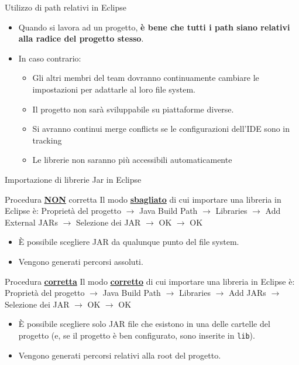 \documentclass[presentation]{beamer}
\begin{document}
\begin{frame}{Utilizzo di path relativi in Eclipse}
	\begin{itemize}\itemsep20pt
		\item Quando si lavora ad un progetto, \textbf{è bene che tutti i path siano relativi alla radice del progetto stesso}.
		\item In caso contrario:
		\begin{itemize}
			\item Gli altri membri del team dovranno continuamente cambiare le impostazioni per adattarle al loro file system.
			\item Il progetto non sarà sviluppabile su piattaforme diverse.
			\item Si avranno continui merge conflicts se le configurazioni dell'IDE sono in tracking
			\item Le librerie non saranno più accessibili automaticamente
		\end{itemize}
	\end{itemize}
\end{frame}

\begin{frame}[allowframebreaks]{Importazione di librerie Jar in Eclipse}
	\begin{block}{Procedura \textbf{\underline{NON}} corretta}
		Il modo \textbf{\underline{sbagliato}} di cui importare una libreria in Eclipse è: Proprietà del progetto $\rightarrow$ Java Build Path $\rightarrow$ Libraries $\rightarrow$ Add External JARs $\rightarrow$ Selezione dei JAR $\rightarrow$ OK $\rightarrow$ OK
		\begin{itemize}
			\item \`{E} possibile scegliere JAR da qualunque punto del file system.
			\item Vengono generati percorsi assoluti.
		\end{itemize}
	\end{block}
	\begin{block}{Procedura \textbf{\underline{corretta}}}
		Il modo \textbf{\underline{corretto}} di cui importare una libreria in Eclipse è: Proprietà del progetto $\rightarrow$ Java Build Path $\rightarrow$ Libraries $\rightarrow$ Add JARs $\rightarrow$ Selezione dei JAR $\rightarrow$ OK $\rightarrow$ OK
		\begin{itemize}
			\item \`{E} possibile scegliere solo JAR file che esistono in una delle cartelle del progetto (e, se il progetto è ben configurato, sono inserite in \texttt{lib}).
			\item Vengono generati percorsi relativi alla root del progetto.
		\end{itemize}
	\end{block}
\end{frame}
\end{document}
